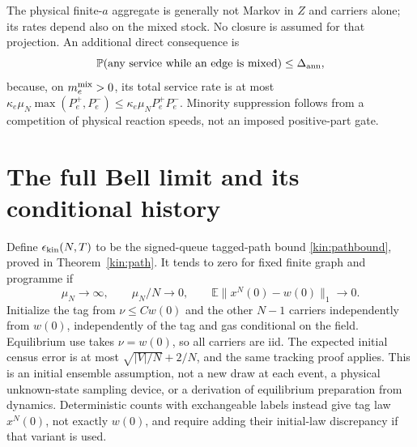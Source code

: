 \documentclass[11pt,oneside,openany]{book}
\theoremstyle{definition}
\theoremstyle{remark}\newtheorem{remark}[theorem]{Remark}
\providecommand{\E}{\mathbb E}
\providecommand{\Prb}{\mathbb P}
\begin{document}
The physical finite-$a$ aggregate is generally not Markov in $Z$ and carriers alone; its rates depend also on the mixed stock. No closure is assumed for that projection. An additional direct consequence is
\[
 \Prb(\text{any service while an edge is mixed})\le\Delta_{\rm ann},
\]
because, on $m_e^{\rm mix}>0$, its total service rate is at most $\kappa_e\mu_N\max(P_e^+,P_e^-)\le\kappa_e\mu_NP_e^+P_e^-$. Minority suppression follows from a competition of physical reaction speeds, not an imposed positive-part gate.

\section{The full Bell limit and its conditional history}\label{p:sec-mainlimit}
Define $\epsilon_{\rm kin}(N,T)$ to be the signed-queue tagged-path bound \eqref{kin:pathbound}, proved in Theorem~\ref{kin:path}. It tends to zero for fixed finite graph and programme if
\begin{equation}
 \mu_N\longrightarrow\infty,\qquad \mu_N/N\longrightarrow0,
 \qquad \E\|x^N(0)-w(0)\|_1\longrightarrow0.
 \label{p:eq-kineticscale}
\end{equation}
Initialize the tag from $\nu\le Cw(0)$ and the other $N-1$ carriers independently from $w(0)$, independently of the tag and gas conditional on the field. Equilibrium use takes $\nu=w(0)$, so all carriers are iid. The expected initial census error is at most $\sqrt{|V|/N}+2/N$, and the same tracking proof applies. This is an initial ensemble assumption, not a new draw at each event, a physical unknown-state sampling device, or a derivation of equilibrium preparation from dynamics. Deterministic counts with exchangeable labels instead give tag law $x^N(0)$, not exactly $w(0)$, and require adding their initial-law discrepancy if that variant is used.
\end{document}
